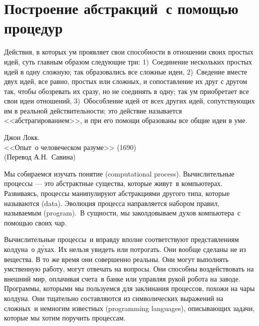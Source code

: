 \chapter{Построение абстракций~с помощью процедур}
\label{BUILDING-ABSTRACTIONS-WITH-PROCEDURES}
\thispagestyle{empty}

\epigraph{
Действия, в которых ум проявляет свои способности в отношении
своих простых идей, суть главным образом следующие три: 1)~Соединение
нескольких простых идей в одну сложную; так образовались все сложные
идеи,  2)~Сведение вместе двух идей, все равно, простых или сложных, и
сопоставление их друг с другом так, чтобы обозревать их сразу, но не
соединять в одну; так ум приобретает все свои идеи отношений, 3)~Обособление 
идей от всех других идей, сопутствующих им в реальной
действительности; это действие называется <<абстрагированием>>, и при
его помощи образованы все общие идеи в уме.
%
%
}%
{Джон Локк. \\
<<Опыт~о человеческом разуме>> (1690) \\ %
(Перевод А.Н.~Савина)}

Мы собираемся изучать понятие
%
 (com\-pu\-ta\-ti\-o\-nal process).
Вычислительные процессы --- это абстрактные
существа, которые живут~в компьютерах.  Развиваясь, процессы
манипулируют абстракциями другого типа, которые называются
 (data). Эволюция процесса направляется набором
правил, называемым  (program).~В сущности, мы
заколдовываем духов компьютера~с помощью своих чар.


Вычислительные процессы~и вправду вполне соответствуют представлениям
колдуна~о д\'{у}хах.  Их нельзя увидеть или
потрогать.  Они вообще сделаны не из вещества. В то же время они
совершенно реальны.  Они могут выполнять умственную работу, могут
отвечать на вопросы. Они способны воздействовать на внешний мир,
оплачивая счета~в банке или управляя рукой робота на заводе.
Программы, которыми мы пользуемся для заклинания процессов, похожи
на чары колдуна.  Они тщательно составляются из символических
выражений на сложных~и немногим известных  (programming languages), описывающих задачи, которые мы хотим
поручить процессам.

